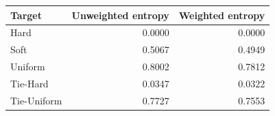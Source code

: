 \begin{tabular}{lrr}
\toprule
Target & Unweighted entropy & Weighted entropy \\
\midrule
Hard & 0.0000 & 0.0000 \\
Soft & 0.5067 & 0.4949 \\
Uniform & 0.8002 & 0.7812 \\
Tie-Hard & 0.0347 & 0.0322 \\
Tie-Uniform & 0.7727 & 0.7553 \\
\bottomrule
\end{tabular}
